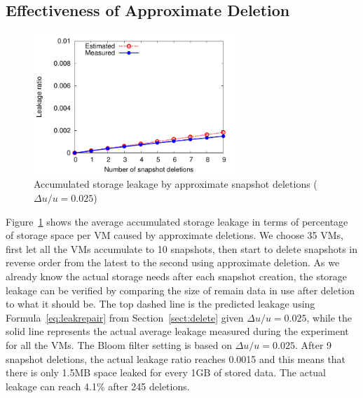  \subsection{Effectiveness of Approximate Deletion}

 \begin{figure}
\vspace{-0.1in}
     \centering
     \includegraphics[width=3in]{figures/leakage}
     \caption{Accumulated storage leakage by approximate snapshot deletions ($\Delta u/u=0.025$)}
     \label{fig:leakage}
 \end{figure}

Figure~\ref{fig:leakage} shows the average accumulated storage leakage in terms of percentage of
storage space per VM caused  by approximate deletions.
We choose 35 VMs, first let all the VMs accumulate to 10 snapshots, then start to delete snapshots
in reverse order from the latest to the second using approximate deletion.
As we already know the actual storage needs after each snapshot creation,
the storage leakage can be verified by
comparing the size of remain data in use after deletion to what it should be.
The top dashed line is the predicted leakage using Formula~\ref{eq:leakrepair} from Section~\ref{sect:delete}
given $\Delta u/u=0.025$,
while the solid line represents the actual average leakage measured during the experiment for all the VMs. 
The Bloom filter setting is based on $\Delta u/u=0.025$.
After 9 snapshot deletions, the actual leakage ratio reaches 0.0015 and this means that
there is only 1.5MB space leaked for every 1GB of stored data.
The actual leakage can reach  4.1\% after  245 deletions.
